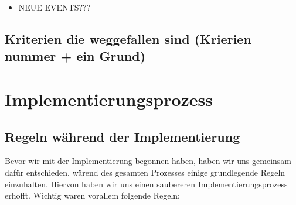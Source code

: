\documentclass[parskip=full,11pt,twoside]{scrartcl}
\begin{document}
\begin{itemize}
    \item NEUE EVENTS???
\end{itemize}
\subsection{Kriterien die weggefallen sind (Krierien nummer + ein Grund)}
\newpage

\section{Implementierungsprozess}
\subsection{Regeln während der Implementierung}
Bevor wir mit der Implementierung begonnen haben, haben wir uns gemeinsam dafür entschieden, wärend des gesamten Prozesses einige grundlegende Regeln einzuhalten.
Hiervon haben wir uns einen saubereren Implementierungsprozess erhofft.
Wichtig waren vorallem folgende Regeln:
\end{document}
